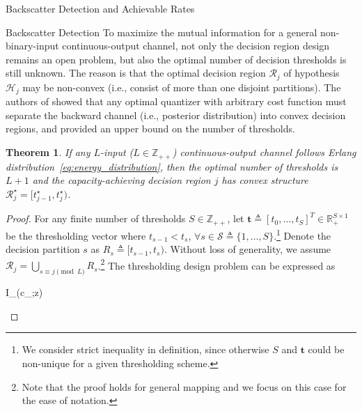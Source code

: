 \documentclass[journal]{IEEEtran}
\newtheorem{theorem}{Theorem}
\begin{document}
\begin{section}{Backscatter Detection and Achievable Rates}
\begin{subsection}{Backscatter Detection}
			To maximize the mutual information for a general non-binary-input continuous-output channel, not only the decision region design remains an open problem, but also the optimal number of decision thresholds is still unknown. The reason is that the optimal decision region $\mathcal{R}_j$ of hypothesis $\mathcal{H}_j$ may be non-convex (i.e., consist of more than one disjoint partitions). The authors of \cite{Nguyen2021} showed that any optimal quantizer with arbitrary cost function must separate the backward channel  (i.e., posterior distribution) into convex decision regions, and provided an upper bound on the number of thresholds.

			\begin{theorem}
				If any $L$-input ($L \in \mathbb{Z}_{++}$) continuous-output channel follows Erlang distribution~\eqref{eq:energy_distribution}, then the optimal number of thresholds is $L+1$ and the capacity-achieving decision region $j$ has convex structure $\mathcal{R}_j^{\star} = [t_{j-1}^{\star}, t_j^{\star})$.
			\end{theorem}

			\begin{proof}
				For any finite number of thresholds $S \in \mathbb{Z}_{++}$, let $\boldsymbol{t} \triangleq [t_0,\ldots,t_S]^T \in \mathbb{R}_{+}^{S \times 1}$ be the thresholding vector where $t_{s-1} < t_s$, $\forall s \in \mathcal{S} \triangleq \{1,\ldots,S\}$.\footnote{We consider strict inequality in definition, since otherwise $S$ and $\boldsymbol{t}$ could be non-unique for a given thresholding scheme.} Denote the decision partition $s$ as $R_s \triangleq [t_{s-1},t_s)$. Without loss of generality, we assume
				$\mathcal{R}_j = \bigcup_{s \equiv j \pmod L} R_s$.\footnote{Note that the proof holds for general mapping and we focus on this case for the ease of notation.} The thresholding design problem can be expressed as
				\begin{maxi!}
					{}{I_{}(c_{};z)}{\label{op:thresholding}}{\label{ob:backscatter_mutual_information}}
				\end{maxi!}


\end{proof}
\end{subsection}
\end{section}
\end{document}
